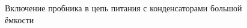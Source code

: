\begin{figure}[H]
  \captionsetup{singlelinecheck=true} %
  \caption{Включение пробника в цепь питания с конденсаторами большой ёмкости} \label{p:report_powe_stend_hi_capasitor}
\end{figure}





